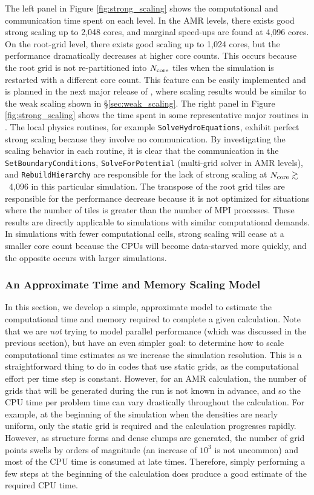 The left panel in Figure \ref{fig:strong_scaling} shows the
computational and communication time spent on each level.  In the AMR
levels, there exists good strong scaling up to 2,048 cores, and
marginal speed-ups are found at 4,096 cores.  On the root-grid level,
there exists good scaling up to 1,024 cores, but the performance
dramatically decreases at higher core counts.  This occurs because the
root grid is not re-partitioned into $N_{\rm core}$ tiles when the
simulation is restarted with a different core count.  This feature can
be easily implemented and is planned in the next major release of
\enzo, where scaling results would be similar to the weak scaling shown
in \S\ref{sec:weak_scaling}.  The right panel in Figure
\ref{fig:strong_scaling} shows the time spent in some representative
major routines in \enzo.  The local physics routines, for example
\texttt{SolveHydroEquations}, exhibit perfect strong scaling because
they involve no communication.  By investigating the scaling behavior
in each routine, it is clear that the communication in the
\texttt{SetBoundaryConditions}, \texttt{SolveForPotential} (multi-grid
solver in AMR levels), and \texttt{RebuildHierarchy} are responsible
for the lack of strong scaling at $N_{\rm core} \gtrsim$~4,096 in this
particular simulation.  The transpose of the root grid tiles are
responsible for the performance decrease because it is not optimized
for situations where the number of tiles is greater than the number of
MPI processes.  These results are directly applicable to simulations
with similar computational demands.  In simulations with fewer
computational cells, strong scaling will cease at a smaller core count
because the CPUs will become data-starved more quickly, and the
opposite occurs with larger simulations.


\subsubsection{An Approximate Time and Memory Scaling Model}

In this section, we develop a simple, approximate model to estimate
the computational time and memory required to complete a given
calculation.  Note that we are {\it not} trying to model parallel
performance (which was discussed in the previous section), but have an
even simpler goal: to determine how to scale computational time
estimates as we increase the simulation resolution.  This is a
straightforward thing to do in codes that use static grids, as the
computational effort per time step is constant.  However, for an AMR
calculation, the number of grids that will be generated during the run
is not known in advance, and so the CPU time per problem time can vary
drastically throughout the calculation.  For example, at the beginning
of the simulation when the densities are nearly uniform, only the
static grid is required and the calculation progresses rapidly.
However, as structure forms and dense clumps are generated, the number
of grid points swells by orders of magnitude (an increase of $10^3$ is
not uncommon) and most of the CPU time is consumed at late times.
Therefore, simply performing a few steps at the beginning of the
calculation does produce a good estimate of the required CPU time.

